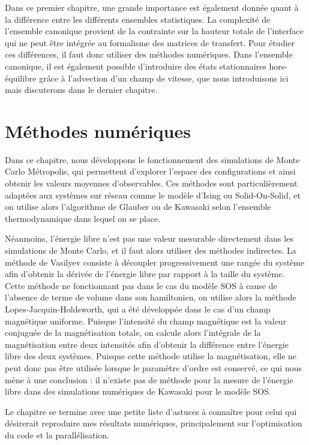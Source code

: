 Dans ce premier chapitre, une grande importance est également donnée quant à la différence entre les différents ensembles statistiques. La complexité de l'ensemble canonique provient de la contrainte sur la hauteur totale de l'interface qui ne peut être intégrée au formalisme des matrices de transfert. Pour étudier ces différences, il faut donc utiliser des méthodes numériques. Dans l'ensemble canonique, il est également possible d'introduire des états stationnaires hors-équilibre grâce à l'advection d'un champ de vitesse, que nous introduisons ici mais discuterons dans le dernier chapitre.


\section*{Méthodes numériques}

Dans ce chapitre, nous développons le fonctionnement des simulations de Monte Carlo Métropolis, qui permettent d'explorer l'espace des configurations et ainsi obtenir les valeurs moyennes d'observables. Ces méthodes sont particulièrement adaptées aux systèmes sur réseau comme le modèle d'Ising ou Solid-On-Solid, et on utilise alors l'algorithme de Glauber ou de Kawasaki selon l'ensemble thermodynamique dans lequel on se place. 

Néanmoins, l'énergie libre n'est pas une valeur mesurable directement dans les simulations de Monte Carlo, et il faut alors utiliser des méthodes indirectes. La méthode de Vasilyev consiste à découpler progressivement une rangée du système afin d'obtenir la dérivée de l'énergie libre par rapport à la taille du système. Cette méthode ne fonctionnant pas dans le cas du modèle SOS à cause de l'absence de terme de volume dans son hamiltonien, on utilise alors la méthode Lopes-Jacquin-Holdsworth, qui a été développée dans le cas d'un champ magnétique uniforme. Puisque l'intensité du champ magnétique est la valeur conjuguée de la magnétisation totale, on calcule alors l'intégrale de la magnétisation entre deux intensités afin d'obtenir la différence entre l'énergie libre des deux systèmes. Puisque cette méthode utilise la magnétisation, elle ne peut donc pas être utilisée lorsque le paramètre d'ordre est conservé, ce qui nous mène à une conclusion : il n'existe pas de méthode pour la mesure de l'énergie libre dans des simulations numériques de Kawasaki pour le modèle SOS.

Le chapitre se termine avec une petite liste d'astuces à connaître pour celui qui désirerait reproduire mes résultats numériques, principalement sur l'optimisation du code et la parallélisation.


